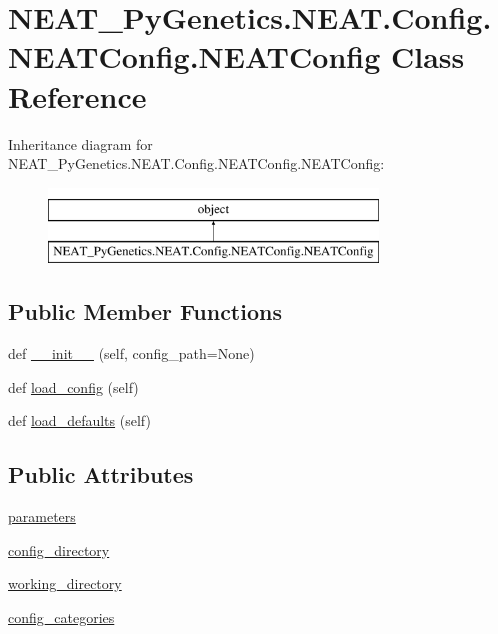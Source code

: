 \hypertarget{classNEAT__PyGenetics_1_1NEAT_1_1Config_1_1NEATConfig_1_1NEATConfig}{}\section{N\+E\+A\+T\+\_\+\+Py\+Genetics.\+N\+E\+A\+T.\+Config.\+N\+E\+A\+T\+Config.\+N\+E\+A\+T\+Config Class Reference}
\label{classNEAT__PyGenetics_1_1NEAT_1_1Config_1_1NEATConfig_1_1NEATConfig}
Inheritance diagram for N\+E\+A\+T\+\_\+\+Py\+Genetics.\+N\+E\+A\+T.\+Config.\+N\+E\+A\+T\+Config.\+N\+E\+A\+T\+Config\+:\begin{figure}[H]
\begin{center}
\leavevmode
\includegraphics[height=2.000000cm]{classNEAT__PyGenetics_1_1NEAT_1_1Config_1_1NEATConfig_1_1NEATConfig}
\end{center}
\end{figure}
\subsection*{Public Member Functions}
\begin{DoxyCompactItemize}
\item 
def \hyperlink{classNEAT__PyGenetics_1_1NEAT_1_1Config_1_1NEATConfig_1_1NEATConfig_a88504e0a5c56f166a3ee5898ae3e0dea}{\+\_\+\+\_\+init\+\_\+\+\_\+} (self, config\+\_\+path=None)
\item 
def \hyperlink{classNEAT__PyGenetics_1_1NEAT_1_1Config_1_1NEATConfig_1_1NEATConfig_aa6843226e3a017a384c8244f4e62e0f5}{load\+\_\+config} (self)
\item 
def \hyperlink{classNEAT__PyGenetics_1_1NEAT_1_1Config_1_1NEATConfig_1_1NEATConfig_a2669153b4f4160d33477fc89d16dd716}{load\+\_\+defaults} (self)
\end{DoxyCompactItemize}
\subsection*{Public Attributes}
\begin{DoxyCompactItemize}
\item 
\hyperlink{classNEAT__PyGenetics_1_1NEAT_1_1Config_1_1NEATConfig_1_1NEATConfig_a04ae4f640ee3d8a9dadbbe0a293bb3d6}{parameters}
\item 
\hyperlink{classNEAT__PyGenetics_1_1NEAT_1_1Config_1_1NEATConfig_1_1NEATConfig_ae3bd7eb4a5b4ad753d5c2de3c70aed06}{config\+\_\+directory}
\item 
\hyperlink{classNEAT__PyGenetics_1_1NEAT_1_1Config_1_1NEATConfig_1_1NEATConfig_ac88a0f28d412192f52a5cb55935beaa4}{working\+\_\+directory}
\item 
\hyperlink{classNEAT__PyGenetics_1_1NEAT_1_1Config_1_1NEATConfig_1_1NEATConfig_a1e2b0edc6558d673c7f7a197d2faa72e}{config\+\_\+categories}
\end{DoxyCompactItemize}


